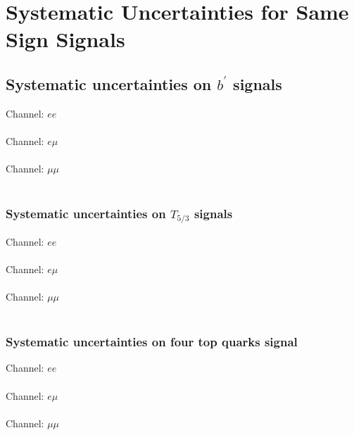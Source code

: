 

\chapter{Systematic Uncertainties for Same Sign Signals}

\section{Systematic uncertainties on $b^\prime$ signals}
\label{App:SameSignSystematics}

\begin{centering}
\tiny
Channel: $ee$ \\

\\
Channel: $e \mu$ \\

\\
Channel: $\mu \mu$ \\

\\
\label{tab:systematicsBprime}
\end{centering}


\subsection{Systematic uncertainties on $T_{5/3}$ signals}
\begin{centering}
\tiny
Channel: $ee$ \\

\\
Channel: $e \mu$ \\

\\
Channel: $\mu \mu$ \\

\\
\label{tab:systematicsT53}
\end{centering}


\subsection{Systematic uncertainties on four top quarks signal}
\begin{centering}
\tiny
Channel: $ee$ \\

\\
Channel: $e \mu$ \\

\\
Channel: $\mu \mu$ \\

\\
\label{tab:systematics4t}
\end{centering}


